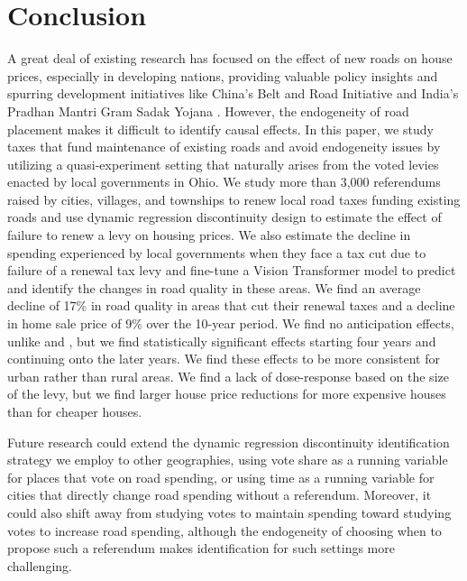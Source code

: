 \section{Conclusion} \label{sec:conclusion}

A great deal of existing research has focused on the effect of new roads on house prices, especially in developing nations, providing valuable policy insights and spurring development initiatives like China’s Belt \citep{huang2016understanding} and Road Initiative and India’s Pradhan Mantri Gram Sadak Yojana \citep{asher2020}. However, the endogeneity of road placement makes it difficult to identify causal effects. In this paper, we study taxes that fund maintenance of existing roads and avoid endogeneity issues by utilizing a quasi-experiment setting that naturally arises from the voted levies enacted by local governments in Ohio. We study more than 3,000 referendums raised by cities, villages, and townships to renew local road taxes funding existing roads and use dynamic regression discontinuity design to estimate the effect of failure to renew a levy on housing prices. We also estimate the decline in spending experienced by local governments when they face a tax cut due to failure of a renewal tax levy and fine-tune a Vision Transformer model to predict and identify the changes in road quality in these areas. We find an average decline of 17\% in road quality in areas that cut their renewal taxes and a decline in home sale price of 9\% over the 10-year period. We find no anticipation effects, unlike \cite{beenstock2016hedonic} and \cite{diao2017spatial}, but we find statistically significant effects starting four years and continuing onto the later years. We find these effects to be more consistent for urban rather than rural areas. We find a lack of dose-response based on the size of the levy, but we find larger house price reductions for more expensive houses than for cheaper houses.  

\noindent Future research could extend the dynamic regression discontinuity identification strategy we employ to other geographies, using vote share as a running variable for places that vote on road spending, or using time as a running variable for cities that directly change road spending without a referendum. Moreover, it could also shift away from studying votes to maintain spending toward studying votes to increase road spending, although the endogeneity of choosing when to propose such a referendum makes identification for such settings more challenging.


